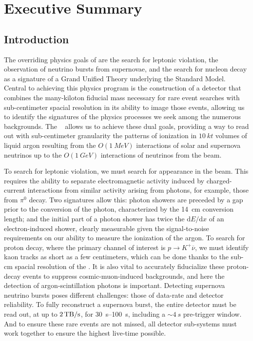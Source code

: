 \chapter{Executive Summary}
\label{ch:fdsp-execsum}

\section{Introduction}
\label{sec:fdsp-exec-introduction}


The overriding physics goals of  are the search for leptonic  violation, the observation of neutrino bursts from supernovae, and the search for nucleon decay as a signature of a Grand Unified Theory underlying the Standard Model. Central to achieving this physics program is the construction of a detector that combines the many-kiloton fiducial mass necessary for rare event searches with sub-centimeter spacial resolution in its ability to image those events, allowing us to identify the signatures of the physics processes we seek among the numerous backgrounds. The  ~\cite{Rubbia:1977zz} allows us to achieve these dual goals, providing a way to read out with sub-centimeter granularity the patterns of ionization in $\SI{10}{kt}$ volumes of liquid argon resulting from the $O(\SI{1}{MeV})$ interactions of solar and supernova neutrinos up to the $O(\SI{1}{GeV})$ interactions of neutrinos from the  beam.

To search for leptonic  violation, we must search for \nue appearance in the  \numu beam. This requires the ability to separate electromagnetic activity induced by charged-current \nue interactions from similar activity arising from photons, for example, those from $\pi^{0}$ decay. Two signatures allow this: photon showers are preceded by a gap prior to the conversion of the photon, characterized by the \SI{14}{cm} conversion length; and the initial part of a photon shower has twice the $\mathrm{d}E/\mathrm{d}x$ of an electron-induced shower, clearly measurable given the signal-to-noise requirements on our ability to measure the ionization of the argon. To search for proton decay, where the primary channel of interest is $p\rightarrow K^{+}\overline{\nu}$, we must identify kaon tracks as short as a few centimeters, which can be done thanks to the sub-\si{cm} spacial resolution of the . It is also vital to accurately fiducialize these proton-decay events to suppress cosmic-muon-induced backgrounds, and here the detection of argon-scintillation photons is important. Detecting supernova neutrino bursts poses different challenges: those of data-rate and detector reliability. To fully reconstruct a supernova burst, the entire detector must be read out, at up to $\SI{2}{\tera\byte/\second}$, for \SIrange{30}{100}{s}, including a $\sim\!\SI{4}{s}$ pre-trigger window. And to ensure these rare events are not missed, all detector sub-systems must work together to ensure the highest live-time possible.

